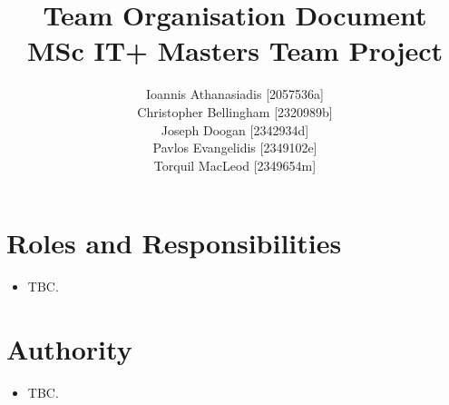 \documentclass[a4paper, 12pt, titlepage]{article}
\title{\textbf{Team Organisation Document} \\ MSc IT+ Masters Team Project}
\author{
	Ioannis Athanasiadis [2057536a] \\
	Christopher Bellingham [2320989b] \\
	Joseph Doogan [2342934d] \\
	Pavlos Evangelidis [2349102e] \\
	Torquil MacLeod [2349654m]
}
\begin{document}
	\maketitle

	\section{Roles and Responsibilities}
	\begin{itemize}
		\item TBC.
	\end{itemize}

	\section{Authority}
	\begin{itemize}
		\item TBC.
	\end{itemize}
\end{document}
